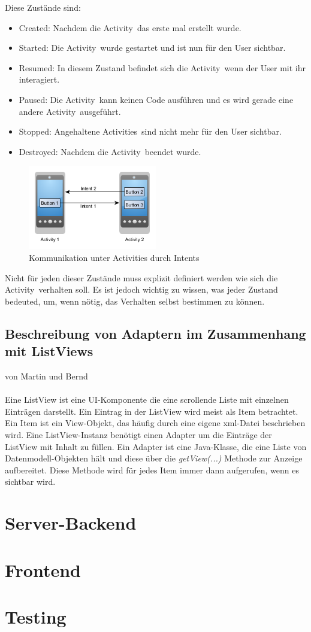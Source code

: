 \documentclass[a4paper, titlepage]{scrartcl}
\newcommand{\AUTHOR}[1]{
	von #1 \\ \\
}
\newcommand{\METHODE}[1]{\emph{#1}}
\begin{document}
Diese Zustände sind:

\begin{itemize}
	\item Created: Nachdem die \glqq Activity\grqq\ das erste mal erstellt wurde.
	\item Started: Die \glqq Activity\grqq\ wurde gestartet und ist nun für den User sichtbar.
	\item Resumed: In diesem Zustand befindet sich die \glqq Activity\grqq\ wenn der User mit ihr interagiert.
	\item Paused: Die \glqq Activity\grqq\ kann keinen Code ausführen und es wird gerade eine andere \glqq Activity\grqq\ ausgeführt.
	\item Stopped: Angehaltene \glqq Activities\grqq\ sind nicht mehr für den User sichtbar.
	\item Destroyed: Nachdem die \glqq Activity\grqq\ beendet wurde.
\end{itemize}

\begin{figure}[htb]
\centering
\includegraphics[width=0.5\textwidth]{graphics/Intent.png}
\caption{Kommunikation unter Activities durch Intents}
\label{fig:intent}
\end{figure}

Nicht für jeden dieser Zustände muss explizit definiert werden wie sich die \glqq Activity\grqq\ verhalten soll. Es ist jedoch wichtig zu wissen, was jeder Zustand bedeuted, um, wenn nötig, das Verhalten selbst bestimmen zu können.


\subsection{Beschreibung von Adaptern im Zusammenhang mit ListViews}
\label{sec:adapter}
\AUTHOR{Martin und Bernd}
Eine ListView ist eine UI-Komponente die eine scrollende Liste mit einzelnen Einträgen darstellt. Ein Eintrag in der ListView wird meist als Item betrachtet. Ein Item ist ein View-Objekt, das häufig durch eine eigene xml-Datei beschrieben wird. Eine ListView-Instanz benötigt einen Adapter um die Einträge der ListView mit Inhalt zu füllen. Ein Adapter ist eine Java-Klasse, die eine Liste von Datenmodell-Objekten hält und diese über die \METHODE{getView(...)} Methode zur Anzeige aufbereitet. Diese Methode wird für jedes Item immer dann aufgerufen, wenn es sichtbar wird.

\section{Server-Backend}


\section{Frontend}


\section{Testing}

\end{document}
